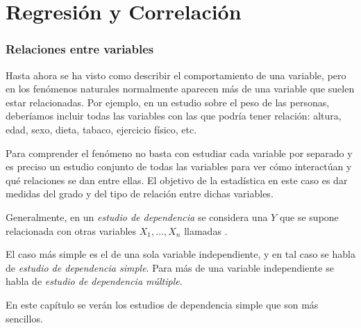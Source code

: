 \section{Regresión y Correlación}





\begin{frame}
\frametitle{Relaciones entre variables}
Hasta ahora se ha visto como describir el comportamiento de una variable, pero en los fenómenos naturales normalmente aparecen más de una
variable que suelen estar relacionadas. 
Por ejemplo, en un estudio sobre el peso de las personas, deberíamos incluir todas las variables con las que podría tener relación: altura, edad, sexo, dieta, tabaco, ejercicio físico, etc.

Para comprender el fenómeno no basta con estudiar cada variable por separado y es preciso un estudio conjunto de todas las variables para ver cómo interactúan y qué relaciones se dan entre ellas. 
El objetivo de la estadística en este caso es dar medidas del grado y del tipo de relación
entre dichas variables.

Generalmente, en un \emph{estudio de dependencia} se considera una  $Y$ que se supone relacionada con otras variables $X_1,\ldots,X_n$ llamadas
.

El caso más simple es el de una sola variable independiente, y en tal caso se habla de \emph{estudio de dependencia simple}. Para más de una variable independiente se habla de \emph{estudio de dependencia múltiple}.

En este capítulo se verán los estudios de dependencia simple que son más sencillos.  

\end{frame}
